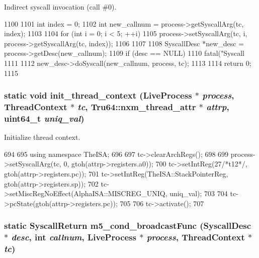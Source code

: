 Indirect syscall invocation (call \#0). 


\begin{DoxyCode}
1100     {
1101         int index = 0;
1102         int new_callnum = process->getSyscallArg(tc, index);
1103 
1104         for (int i = 0; i < 5; ++i)
1105             process->setSyscallArg(tc, i, process->getSyscallArg(tc, index));
1106 
1107 
1108         SyscallDesc *new_desc = process->getDesc(new_callnum);
1109         if (desc == NULL)
1110             fatal("Syscall %
1111 
1112         new_desc->doSyscall(new_callnum, process, tc);
1113 
1114         return 0;
1115     }
\end{DoxyCode}
\hypertarget{classTru64_a83da5f99bb14ade814d1509f55d1db1b}{
\subsubsection[{init\_\-thread\_\-context}]{\setlength{\rightskip}{0pt plus 5cm}static void init\_\-thread\_\-context ({\bf LiveProcess} $\ast$ {\em process}, \/  {\bf ThreadContext} $\ast$ {\em tc}, \/  {\bf Tru64::nxm\_\-thread\_\-attr} $\ast$ {\em attrp}, \/  uint64\_\-t {\em uniq\_\-val})}}
\label{classTru64_a83da5f99bb14ade814d1509f55d1db1b}


Initialize thread context. 


\begin{DoxyCode}
694     {
695         using namespace TheISA;
696 
697         tc->clearArchRegs();
698 
699         process->setSyscallArg(tc, 0, gtoh(attrp->registers.a0));
700         tc->setIntReg(27/*t12*/, gtoh(attrp->registers.pc));
701         tc->setIntReg(TheISA::StackPointerReg, gtoh(attrp->registers.sp));
702         tc->setMiscRegNoEffect(AlphaISA::MISCREG_UNIQ, uniq_val);
703 
704         tc->pcState(gtoh(attrp->registers.pc));
705 
706         tc->activate();
707     }
\end{DoxyCode}
\hypertarget{classTru64_a0553f30a35d45bbc6ba7fd2120332c9c}{
\subsubsection[{m5\_\-cond\_\-broadcastFunc}]{\setlength{\rightskip}{0pt plus 5cm}static {\bf SyscallReturn} m5\_\-cond\_\-broadcastFunc ({\bf SyscallDesc} $\ast$ {\em desc}, \/  int {\em callnum}, \/  {\bf LiveProcess} $\ast$ {\em process}, \/  {\bf ThreadContext} $\ast$ {\em tc})}}
\label{classTru64_a0553f30a35d45bbc6ba7fd2120332c9c}


